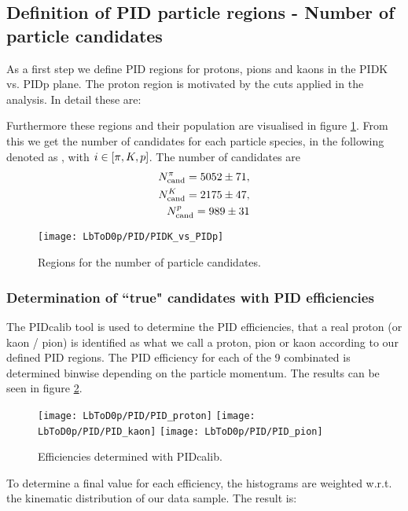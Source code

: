\subsection{Definition of PID particle regions - Number of particle candidates}
As a first step we define PID regions for protons, pions and kaons in the PIDK vs. PIDp plane. 
The proton region is motivated by the cuts applied in the analysis. In detail these are:


Furthermore these regions and their population are visualised in figure \ref{fig:PIDregions}. From this we get the number of candidates for each particle species, in the following denoted as , with $i \in \left[\pi, {K}, {p}\right]$. The number of candidates are
\begin{align}
    N_{\text{cand}}^{\pi} = 5052 \pm 71, \\ 
    N_{\text{cand}}^{{K}} = 2175 \pm 47, \\ 
    N_{\text{cand}}^{{p}} = 989 \pm 31 
\end{align}

\begin{figure}[hptb]
	\centering
	\texttt{[image: LbToD0p/PID/PIDK\_vs\_PIDp]}
	\caption{Regions for the number of particle candidates.}
	\label{fig:PIDregions}
\end{figure}


\subsubsection{Determination of ``true" candidates with PID efficiencies}
The \lhcb PIDcalib tool is used to determine the PID efficiencies, that a real proton (or kaon / pion) is identified as what we call a proton, pion or kaon according to our defined PID regions.
The PID efficiency for each of the 9 combinated is determined binwise depending on the particle momentum. The results can be seen in figure \ref{fig:PIDefficiencies}.

\begin{figure}[hptb]
	\centering
	\texttt{[image: LbToD0p/PID/PID\_proton]}
	\texttt{[image: LbToD0p/PID/PID\_kaon]}
	\texttt{[image: LbToD0p/PID/PID\_pion]}
	\caption{Efficiencies determined with PIDcalib.}
	\label{fig:PIDefficiencies}
\end{figure}

To determine a final value for each efficiency, the histograms are weighted w.r.t. the kinematic distribution of our data sample. The result is:



